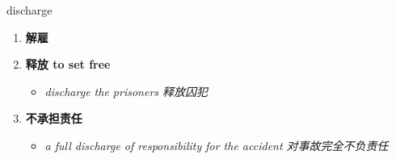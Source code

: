 
\begin{frame}
{\huge discharge}
\begin{center}
\begin{enumerate}\Large
  \item \textbf{解雇}
  \item \textbf{释放 to set free}
  \begin{itemize}
    \item \em{\Large{discharge the prisoners 释放囚犯}}
  \end{itemize}
  \item \textbf{不承担责任}
  \begin{itemize}
    \item \em{\Large{a full discharge of responsibility for the accident 对事故完全不负责任}}
  \end{itemize}
\end{enumerate}
\end{center}
\end{frame}
